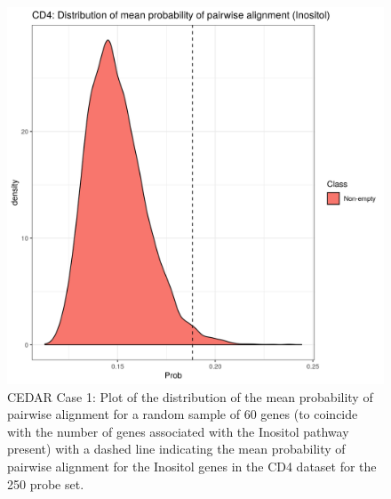 \documentclass[14pt]{extarticle} %
\begin{document}
	\begin{figure}[h]
		\centering
		\includegraphics[scale=0.75]{Images/Biology_data/Set_250/All_datasets/Mean_alignment_probability/CD4_KEGG_INOSITOL_PHOSPHATE_METABOLISM.png}
		\caption{CEDAR Case 1: Plot of the distribution of the mean probability of pairwise alignment for a random sample of 60 genes (to coincide with the number of genes associated with the Inositol pathway present) with a dashed line indicating the mean probability of pairwise alignment for the Inositol genes in the CD4 dataset for the 250 probe set.}
		\label{fig:results:cedar_1:mdi_cd4_inostiol_alignemnt_prob_distn}
	\end{figure}
\end{document}
